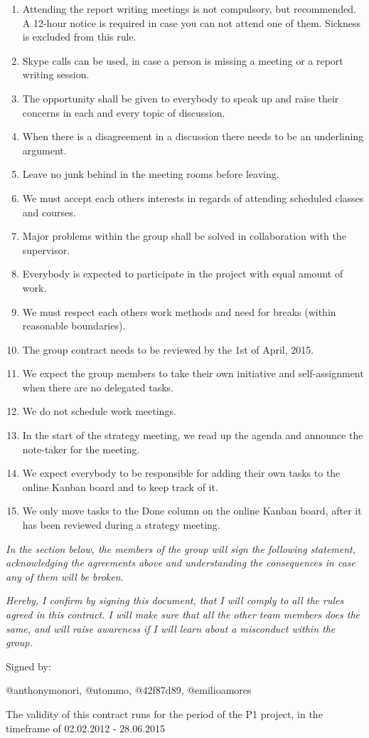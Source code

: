 \begin{enumerate}
	\item Attending the report writing meetings is not compulsory, but recommended. A 12-hour notice is required in case you can not attend one of them. Sickness is excluded from this rule.
	\item Skype calls can be used, in case a person is missing a meeting or a report writing session.
	\item The opportunity shall be given to everybody to speak up and raise their concerns in each and every topic of discussion.
	\item When there is a disagreement in a discussion there needs to be an underlining argument.
	\item Leave no junk behind in the meeting rooms before leaving.
	\item We must accept each others interests in regards of attending scheduled classes and courses.
	\item Major problems within the group shall be solved in collaboration with the supervisor.
	\item Everybody is expected to participate in the project with equal amount of work.
	\item We must respect each others work methods and need for breaks (within reasonable boundaries).
	\item The group contract needs to be reviewed by the 1st of April, 2015.
	\item We expect the group members to take their own initiative and self-assignment when there are no delegated tasks.
	\item We do not schedule work meetings.
	\item In the start of the strategy meeting, we read up the agenda and announce the note-taker for the meeting.
	\item We expect everybody to be responsible for adding their own tasks to the online Kanban board and to keep track of it.
	\item We only move tasks to the Done column on the online Kanban board, after it has been reviewed during a strategy meeting.
\end{enumerate}

\textit{In the section below, the members of the group will sign the following statement, acknowledging the agreements above and understanding the consequences in case any of them will be broken.}

\textit{Hereby, I confirm by signing this document, that I will comply to all the rules agreed in this contract. I will make sure that all the other team members does the same, and will raise awareness if I will learn about a misconduct within the group.}

Signed by:

@anthonymonori, @utommo, @42f87d89, @emilioamores

The validity of this contract runs for the period of the P1 project, in the timeframe of 02.02.2012 - 28.06.2015
